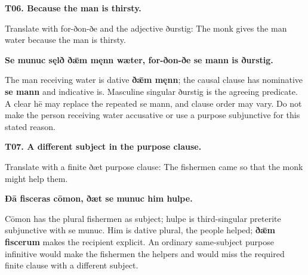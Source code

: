 \par\begin{minipage}{\linewidth}\raggedright
\textbf{T06. Because the man is thirsty.}

Translate with for-ðon-ðe and the adjective ðurstig: The monk gives the man water because the man is thirsty.

\textbf{Se munuc sęlð ðǣm męnn wæter, for-ðon-ðe se mann is ðurstig.}

The man receiving water is dative \textbf{ðǣm męnn}; the causal clause has nominative \textbf{se mann} and indicative is. Masculine singular ðurstig is the agreeing predicate. A clear hē may replace the repeated se mann, and clause order may vary. Do not make the person receiving water accusative or use a purpose subjunctive for this stated reason.

\end{minipage}\par\addvspace{4pt}

\par\begin{minipage}{\linewidth}\raggedright
\textbf{T07. A different subject in the purpose clause.}

Translate with a finite ðæt purpose clause: The fishermen came so that the monk might help them.

\textbf{Ðā fisceras cōmon, ðæt se munuc him hulpe.}

Cōmon has the plural fishermen as subject; hulpe is third-singular preterite subjunctive with se munuc. Him is dative plural, the people helped; \textbf{ðǣm fiscerum} makes the recipient explicit. An ordinary same-subject purpose infinitive would make the fishermen the helpers and would miss the required finite clause with a different subject.

\end{minipage}\par\addvspace{4pt}

